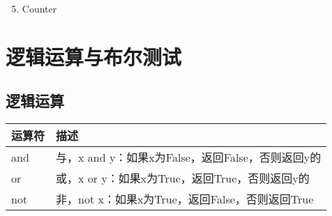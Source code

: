 \documentclass[letterpaper,10pt,english]{sphinxmanual}
\begin{document}
\begin{quote}

\end{quote}
\begin{enumerate}
\setcounter{enumi}{4}
\item {} 
Counter

\end{enumerate}
\begin{quote}

\end{quote}


\section{逻辑运算与布尔测试}
\label{\detokenize{python/12_bool::doc}}\label{\detokenize{python/12_bool:id1}}

\subsection{逻辑运算}
\label{\detokenize{python/12_bool:id2}}

\begin{savenotes}\sphinxattablestart
\centering
{}
\label{\detokenize{python/12_bool:id6}}
\sphinxaftercaption
\begin{tabulary}{\linewidth}[t]{|T|T|}
\hline
\sphinxstyletheadfamily 
运算符
&\sphinxstyletheadfamily 
描述
\\
\hline
and
&
与，x and y：如果x为False，返回False，否则返回y的 
\\
\hline
or
&
或，x or y：如果x为True，返回True，否则返回y的 
\\
\hline
not
&
非，not x：如果x为True，返回False，否则返回True
\\
\hline
\end{tabulary}
\par
\sphinxattableend\end{savenotes}
\end{document}
